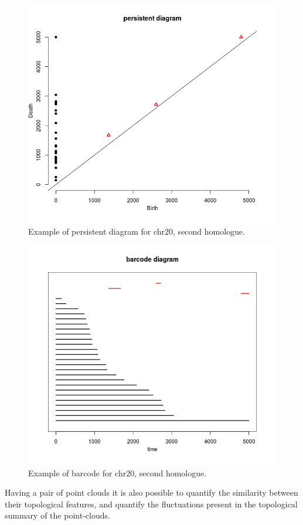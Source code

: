 \documentclass[12pt,a4paper]{article}
\begin{document}
\begin{figure}[hbtp]
\centering
\includegraphics[scale=0.75]{p_dia_2.png}
\caption{Example of persistent diagram for chr20, second homologue.}
\end{figure}

\begin{figure}[hbtp]
\centering
\includegraphics[scale=0.75]{bc_dia_2.png}
\caption{Example of barcode for chr20, second homologue.}
\end{figure}
Having a pair of point clouds it is also possible to quantify the similarity between their topological features, and quantify the fluctuations present in the topological summary of the point-clouds.
\end{document}
